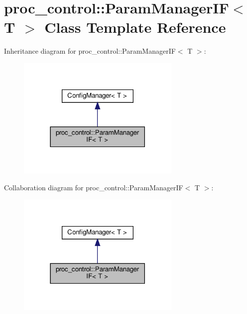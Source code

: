 \hypertarget{classproc__control_1_1_param_manager_i_f}{}\section{proc\+\_\+control\+:\+:Param\+Manager\+IF$<$ T $>$ Class Template Reference}
\label{classproc__control_1_1_param_manager_i_f}


Inheritance diagram for proc\+\_\+control\+:\+:Param\+Manager\+IF$<$ T $>$\+:\nopagebreak
\begin{figure}[H]
\begin{center}
\leavevmode
\includegraphics[width=222pt]{classproc__control_1_1_param_manager_i_f__inherit__graph}
\end{center}
\end{figure}


Collaboration diagram for proc\+\_\+control\+:\+:Param\+Manager\+IF$<$ T $>$\+:\nopagebreak
\begin{figure}[H]
\begin{center}
\leavevmode
\includegraphics[width=222pt]{classproc__control_1_1_param_manager_i_f__coll__graph}
\end{center}
\end{figure}
